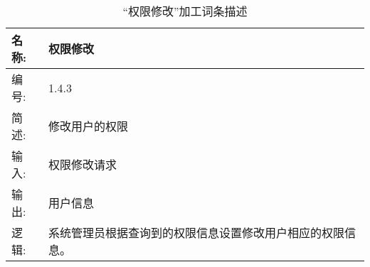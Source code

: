 \begin{table}[H]  
\caption{“权限修改”加工词条描述}  
\begin{center}  
    \begin{tabular}{l p{11cm}} 
        \hline
        \quad 名称:  &   权限修改 \\
        \hline
        \quad 编号:  & 1.4.3 \\
        \hline
        \quad 简述:  & 修改用户的权限 \\
        \hline
        \quad 输入:  & 权限修改请求 \\
        \hline
        \quad 输出:  & 用户信息 \\
        \hline
        \quad 逻辑:  & 系统管理员根据查询到的权限信息设置修改用户相应的权限信息。 \\
        \hline
    \end{tabular}
    \label{tab1}
\end{center}
\end{table}
